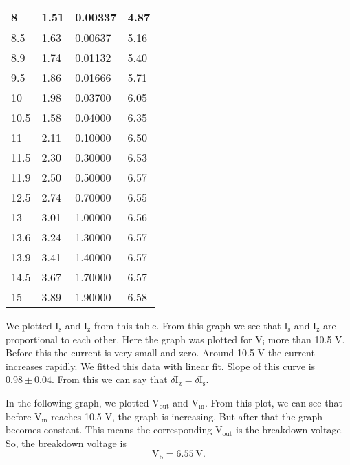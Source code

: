 \documentclass[12pt]{article}
\begin{document}
\begin{longtable}{|l|l|l|l|}
        8      & 1.51    & 0.00337       & 4.87    \\ \hline
        8.5    & 1.63    & 0.00637       & 5.16    \\ \hline
        8.9    & 1.74    & 0.01132       & 5.40    \\ \hline
        9.5    & 1.86    & 0.01666       & 5.71    \\ \hline
        10     & 1.98    & 0.03700       & 6.05    \\ \hline
        10.5   & 1.58    & 0.04000       & 6.35    \\ \hline
        11     & 2.11    & 0.10000       & 6.50    \\ \hline
        11.5   & 2.30    & 0.30000       & 6.53    \\ \hline
        11.9   & 2.50    & 0.50000       & 6.57    \\ \hline
        12.5   & 2.74    & 0.70000       & 6.55    \\ \hline
        13     & 3.01    & 1.00000       & 6.56    \\ \hline
        13.6   & 3.24    & 1.30000       & 6.57    \\ \hline
        13.9   & 3.41    & 1.40000       & 6.57    \\ \hline
        14.5   & 3.67    & 1.70000       & 6.57    \\ \hline
        15     & 3.89    & 1.90000       & 6.58    \\ \hline
\end{longtable}
We plotted \( \mathrm{I_s} \) and \( \mathrm{I_z} \) from this table. From this graph we see that \( \mathrm{I_s}\) and \( \mathrm{I_z }\) are proportional to each other. Here the graph was plotted for \( \mathrm{V_i} \) more than 10.5 V. Before this the current is very small and zero. Around 10.5 V the current increases rapidly. We fitted this data with linear fit. Slope of this curve is \( 0.98 \pm 0.04 \). From this we can say that \( \delta \mathrm{I_z} = \delta \mathrm{I_s}\).

\begin{figure}[H]
    \centering
    
\end{figure}

In the following graph, we plotted \( \mathrm{V_{out}}\) and \( \mathrm{V_{in}}\). From this plot, we can see that before \( \mathrm{V_{in}}\) reaches 10.5 V, the graph is increasing. But after that the graph becomes constant. This means the corresponding \( \mathrm{V_{out}}\) is the breakdown voltage. So, the breakdown voltage is 
\begin{equation*}
\mathrm{V_b} = 6.55 \ \mathrm{V}
.\end{equation*}
\end{document}
